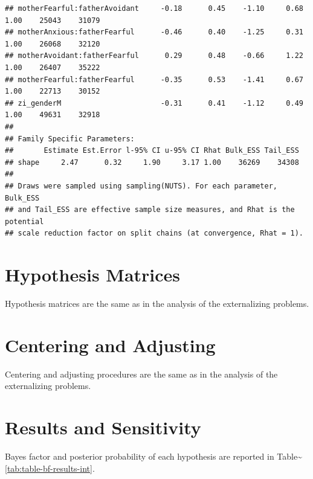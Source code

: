 \documentclass[
]{book}
\begin{document}
\begin{verbatim}
## motherFearful:fatherAvoidant     -0.18      0.45    -1.10     0.68 1.00    25043    31079
## motherAnxious:fatherFearful      -0.46      0.40    -1.25     0.31 1.00    26068    32120
## motherAvoidant:fatherFearful      0.29      0.48    -0.66     1.22 1.00    26407    35222
## motherFearful:fatherFearful      -0.35      0.53    -1.41     0.67 1.00    22713    30152
## zi_genderM                       -0.31      0.41    -1.12     0.49 1.00    49631    32918
## 
## Family Specific Parameters: 
##       Estimate Est.Error l-95% CI u-95% CI Rhat Bulk_ESS Tail_ESS
## shape     2.47      0.32     1.90     3.17 1.00    36269    34308
## 
## Draws were sampled using sampling(NUTS). For each parameter, Bulk_ESS
## and Tail_ESS are effective sample size measures, and Rhat is the potential
## scale reduction factor on split chains (at convergence, Rhat = 1).
\end{verbatim}

\hypertarget{hypothesis-matrices-1}{%
\section{Hypothesis Matrices}\label{hypothesis-matrices-1}}

Hypothesis matrices are the same as in the analysis of the externalizing problems.

\hypertarget{centering-and-adjusting-1}{%
\section{Centering and Adjusting}\label{centering-and-adjusting-1}}

Centering and adjusting procedures are the same as in the analysis of the externalizing problems.

\hypertarget{results-and-sensitivity-1}{%
\section{Results and Sensitivity}\label{results-and-sensitivity-1}}

Bayes factor and posterior probability of each hypothesis are reported in Table\textasciitilde\ref{tab:table-bf-results-int}.
\end{document}
